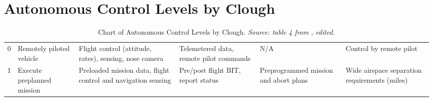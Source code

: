 
\chapter{Autonomous Control Levels by Clough} %

\label{AppendixB} %

\begin{table}
    \tiny
    \caption[Chart of Autonomous Control Levels by Clough]{Chart of Autonomous Control Levels by Clough. \textit{Source: table 4 from \cite{Clough2002}, edited.}}
    \label{tab:chart_of_autonomous_control_levels_by_Clough}
    \centering
        \begin{tabular}{r L{0.1\textwidth} L{0.175\textwidth} L{0.175\textwidth} L{0.175\textwidth} L{0.175\textwidth}}
        \toprule
         &  &  &  &  &  \\
           & Remotely piloted vehicle                      & Flight control (attitude, rates), sensing, nose camera                                                                                                        & Telemetered data, remote pilot commands                                                                                                                                                                                       & N/A                                                                                                                                           & Control by remote pilot \\
        1   & Execute preplanned mission                    & Preloaded mission data, flight control and navigation sensing                                                                                                 & Pre/post flight BIT, report status                                                                                                                                                                                            & Preprogrammed mission and abort plans                                                                                                         & Wide airspace separation requirements (miles) \\

\end{tabular}
\end{table}
